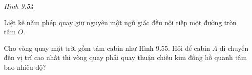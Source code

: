 \begin{exercises}
\begin{questions}[resume=SGK]
\begin{center}
            \textit{Hình 9.54}
        \end{center}

        \answerline
        \answerline
        \answerline

        \item Liệt kê năm phép quay giữ nguyên một ngũ giác đều nội tiếp một đường tròn tâm $O$.

        \answerline

        \item Cho vòng quay mặt trời gồm tám cabin như Hình 9.55. Hỏi để cabin $A$ di chuyển đến vị trí cao nhất thì vòng quay phải quay thuận chiều kim đồng hồ quanh tâm bao nhiêu độ?


        \answerline
    \end{questions}
\end{exercises}

